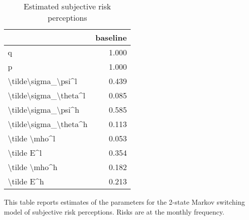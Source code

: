 
\begin{table}[p]
\centering
\begin{adjustbox}{width=0.3\textwidth}
\begin{threeparttable}
\caption{Estimated subjective risk perceptions}
\label{tab:PRMarkovEst}\begin{tabular}{lr}
\toprule
{} &  baseline \\
\midrule
q                     &     1.000 \\
p                     &     1.000 \\
\textbackslash tilde\textbackslash sigma\_\textbackslash psi\textasciicircum l   &     0.439 \\
\textbackslash tilde\textbackslash sigma\_\textbackslash theta\textasciicircum l &     0.085 \\
\textbackslash tilde\textbackslash sigma\_\textbackslash psi\textasciicircum h   &     0.585 \\
\textbackslash tilde\textbackslash sigma\_\textbackslash theta\textasciicircum h &     0.113 \\
\textbackslash tilde \textbackslash mho\textasciicircum l         &     0.053 \\
\textbackslash tilde E\textasciicircum l            &     0.354 \\
\textbackslash tilde \textbackslash mho\textasciicircum h         &     0.182 \\
\textbackslash tilde E\textasciicircum h            &     0.213 \\
\bottomrule
\end{tabular}
\begin{tablenotes}\item This table reports estimates of the parameters 
for the 2-state Markov switching model of subjective risk perceptions. Risks are at the monthly frequency. 
\end{tablenotes}
\end{threeparttable}
\end{adjustbox}
\end{table}